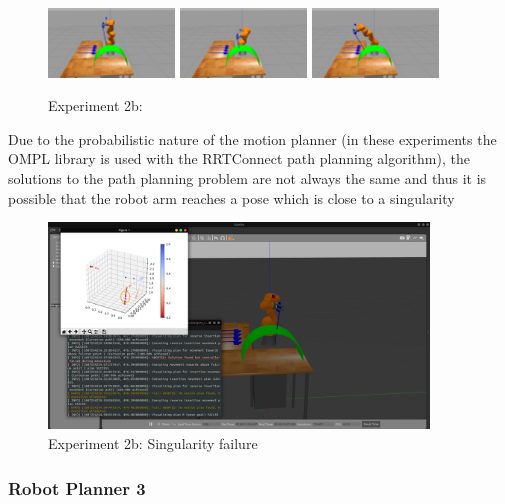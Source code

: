 \begin{center}
\begin{figure}[H]
\includegraphics[width=0.3\textwidth]{images/robot_planner2b/robot_planner2b_7}
\includegraphics[width=0.3\textwidth]{images/robot_planner2b/robot_planner2b_8}
\includegraphics[width=0.3\textwidth]{images/robot_planner2b/robot_planner2b_9}\\
\caption{Experiment 2b:}
\end{figure}
\end{center}

Due to the probabilistic nature of the motion planner (in these experiments the OMPL library is used with the RRTConnect path planning algorithm), the solutions 
to the path planning problem are not always the same and thus it is possible that the robot arm reaches a pose which is close to a singularity
\begin{center}
\begin{figure}[H]
\centering
\includegraphics[width=0.9\textwidth]{images/robot_planner2b/singularity_failure.png}
\caption{Experiment 2b: Singularity failure}
\end{figure}
\end{center}

\subsubsection{Robot Planner 3}

